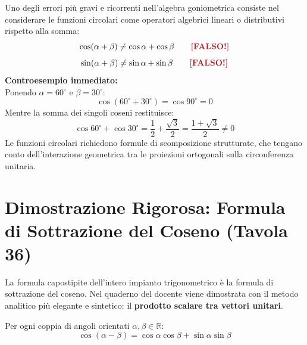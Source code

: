 \documentclass[11pt,a4paper,oneside]{report}
\begin{document}
\begin{attenzione}
Uno degli errori pi\`u gravi e ricorrenti nell'algebra goniometrica consiste nel considerare le funzioni circolari come operatori algebrici lineari o distributivi rispetto alla somma:
\begin{equation}
    \cos(\alpha + \beta) \neq \cos\alpha + \cos\beta \qquad \text{\textbf{\color{alertRed}[FALSO!]}}
\end{equation}
\begin{equation}
    \sin(\alpha + \beta) \neq \sin\alpha + \sin\beta \qquad \text{\textbf{\color{alertRed}[FALSO!]}}
\end{equation}
\textbf{Controesempio immediato:}\\
Ponendo $\alpha = 60^\circ$ e $\beta = 30^\circ$:
\begin{equation}
    \cos(60^\circ + 30^\circ) = \cos 90^\circ = 0
\end{equation}
Mentre la somma dei singoli coseni restituisce:
\begin{equation}
    \cos 60^\circ + \cos 30^\circ = \frac{1}{2} + \frac{\sqrt{3}}{2} = \frac{1 + \sqrt{3}}{2} \neq 0
\end{equation}
Le funzioni circolari richiedono formule di scomposizione strutturate, che tengano conto dell'interazione geometrica tra le proiezioni ortogonali sulla circonferenza unitaria.
\end{attenzione}

\section{Dimostrazione Rigorosa: Formula di Sottrazione del Coseno (Tavola 36)}

La formula capostipite dell'intero impianto trigonometrico \`e la formula di sottrazione del coseno. Nel quaderno del docente viene dimostrata con il metodo analitico pi\`u elegante e sintetico: il \textbf{prodotto scalare tra vettori unitari}.

\begin{teorema}
Per ogni coppia di angoli orientati $\alpha, \beta \in \mathbb{R}$:
\begin{equation}
    \cos(\alpha - \beta) = \cos\alpha\cos\beta + \sin\alpha\sin\beta
\end{equation}
\end{teorema}
\end{document}
